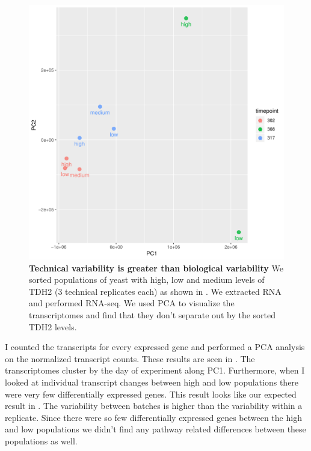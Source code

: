 \begin{figure}[t!]  
    \centering
    \includegraphics[width=\linewidth, scale=0.5]{figures/intro/intro_tdh2_clustering_timepoints.pdf}
    \caption[Technical variability is greater than biological variability]{%
     	\textbf{Technical variability is greater than biological variability}
     	We sorted populations of yeast with high, low and medium levels of TDH2 (3 technical replicates each) as shown in . We extracted RNA and performed RNA-seq. We used PCA to visualize the transcriptomes and find that they don't separate out by the sorted TDH2 levels.
    }
    \label{fig:intro5}
\end{figure}

I counted the transcripts for every expressed gene and performed a PCA analysis on the normalized transcript counts. These results are seen in . The transcriptomes cluster by the day of experiment along PC1. Furthermore, when I looked at individual transcript changes between high and low populations there were very few differentially expressed genes. This result looks like our expected result in . The variability between batches is higher than the variability within a replicate. Since there were so few differentially expressed genes between the high and low populations we didn't find any pathway related differences between these populations as well.

